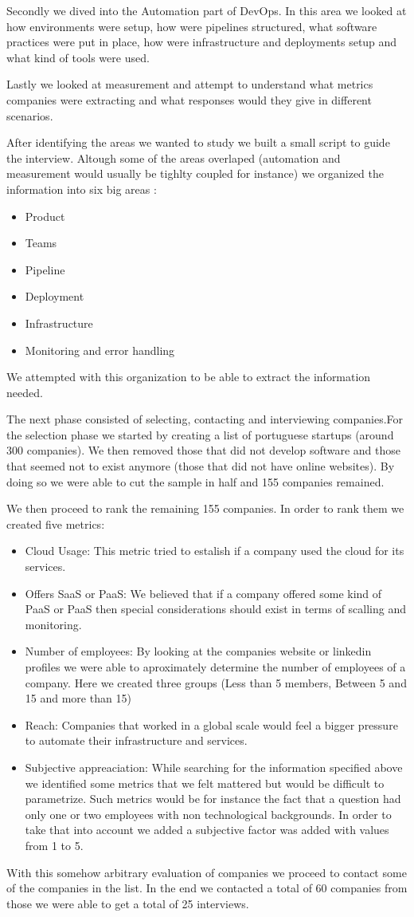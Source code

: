 \documentclass[runningheads,a4paper]{llncs}
\begin{document}
Secondly we dived into the Automation part of DevOps. In this area we looked at how environments were setup, how were pipelines structured, what software practices were put in place, how were infrastructure and deployments setup and what kind of tools were used.

Lastly we looked at measurement and attempt to understand what metrics companies were extracting and what responses would they give in different scenarios.

After identifying the areas we wanted to study we built a small script to guide the interview. Altough some of the areas overlaped (automation and measurement would usually be tighlty coupled for instance) we organized the information into six big areas :
	\begin{itemize}
	\item Product 
	\item Teams
	\item Pipeline
	\item Deployment
	\item Infrastructure
	\item Monitoring and error handling
	\end{itemize}
We attempted with this organization to be able to extract the information needed.

The next phase consisted of selecting, contacting and interviewing companies.For the selection phase we started by creating a list of portuguese startups (around 300 companies). We then removed those that did not develop software and those that seemed not to exist anymore (those that did not have online websites). By doing so we were able to cut the sample in half and 155 companies remained.

We then proceed to rank the remaining 155 companies. In order to rank them we created five metrics:
	\begin{itemize}
	
	\item Cloud Usage: This metric tried to estalish if a company used the cloud for its services.
	\item Offers SaaS or PaaS: We believed that if a company offered some kind of PaaS or PaaS then special considerations should exist in terms of scalling and monitoring.
	\item Number of employees: By looking at the companies website or linkedin profiles we were able to aproximately determine the number of employees of a company. Here we created three groups (Less than 5 members, Between 5 and 15 and more than 15)
	\item Reach: Companies that worked in a global scale would feel a bigger pressure to automate their infrastructure and services.
	\item Subjective appreaciation: While searching for the information specified above we identified some metrics that we felt mattered but would be difficult to parametrize. Such metrics would be for instance the fact that a question had only one or two employees with non technological backgrounds. In order to take that into account we added a subjective factor was added with values from 1 to 5.
	\end{itemize}

With this somehow arbitrary evaluation of companies we proceed to contact some of the companies in the list. In the end we contacted a total of 60 companies from those we were able to get a total of 25 interviews.
\end{document}
